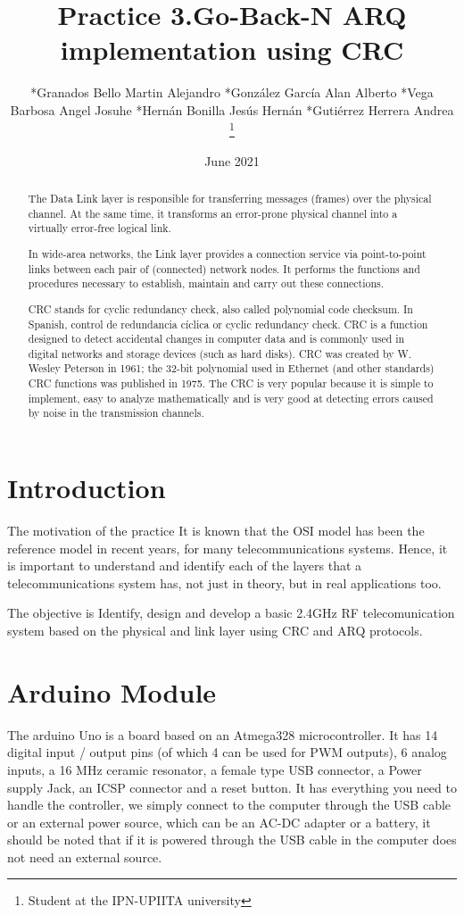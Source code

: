 \documentclass[journal,trans]{IEEEtran}
\title{Practice 3.Go-Back-N ARQ implementation using CRC}
\date{June 2021}
\author{*Granados Bello Martin Alejandro
*González García Alan Alberto
*Vega Barbosa Angel Josuhe 
*Hernán Bonilla Jesús Hernán
*Gutiérrez Herrera Andrea
\thanks{Student at the IPN-UPIITA university }}
\begin{document}
\maketitle

\begin{abstract}
The Data Link layer is responsible for transferring messages (frames) over the physical channel. At the same time, it transforms an error-prone physical channel into a virtually error-free logical link.

In wide-area networks, the Link layer provides a connection service via point-to-point links between each pair of (connected) network nodes. It performs the functions and procedures necessary to establish, maintain and carry out these connections.

CRC stands for cyclic redundancy check, also called polynomial code checksum. In Spanish, control de redundancia cíclica or cyclic redundancy check.
CRC is a function designed to detect accidental changes in computer data and is commonly used in digital networks and storage devices (such as hard disks).
CRC was created by W. Wesley Peterson in 1961; the 32-bit polynomial used in Ethernet (and other standards) CRC functions was published in 1975.
The CRC is very popular because it is simple to implement, easy to analyze mathematically and is very good at detecting errors caused by noise in the transmission channels.

\end{abstract}

\section{Introduction}

The motivation of the practice It is known that the OSI model has been the reference model in
recent years, for many telecommunications systems. Hence, it is important to
understand and identify each of the layers that a telecommunications system
has, not just in theory, but in real applications too.

The objective is Identify, design and develop a basic 2.4GHz RF telecomunication
system based on the physical and link layer using CRC and ARQ protocols.
\section{\textbf{Arduino Module}}
The arduino Uno is a board based on an Atmega328 microcontroller. It has 14 digital input / output pins (of which 4 can be used for PWM outputs), 6 analog inputs, a 16 MHz ceramic resonator, a female type USB connector, a Power supply Jack, an ICSP connector and a reset button.
It has everything you need to handle the controller, we simply connect to the computer through the USB cable or an external power source, which can be an AC-DC adapter or a battery, it should be noted that if it is powered through the USB cable in the computer does not need an external source.
\cite{casco2014raspberr}
\end{document}
